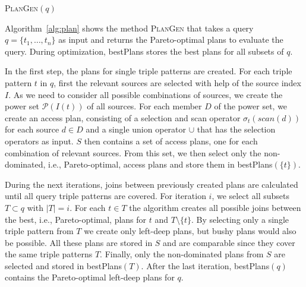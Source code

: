\begin{algorithm}
  \label{alg:plan}
  \DontPrintSemicolon


  \caption{\textsc{PlanGen}$(q)$}


  \Return {}
\end{algorithm}


Algorithm~\ref{alg:plan} shows the method \textsc{PlanGen} that takes
a query $q=\{t_1,\ldots,t_n\}$ as input and returns the Pareto-optimal
plans to evaluate the query. During optimization, \textsf{bestPlans}
stores the best plans for all subsets of $q$. 

In the first step, the plans for single triple patterns are
created. For each triple pattern $t$ in $q$, first the relevant
sources are selected with help of the source index $I$. As we need to
consider all possible combinations of sources, we create the power set
$\mathcal{P}(I(t))$ of all sources. For each member $D$ of the power
set, we create an access plan, consisting of a selection and scan
operator $\sigma_t(scan(d))$ for each source $d \in D$ and a single
union operator $\cup$ that has the selection operators as input. $S$
then contains a set of access plans, one for each combination of
relevant sources. From this set, we then select only the
non-dominated, i.e., Pareto-optimal, access plans and store them in
\textsf{bestPlans}$(\{t\})$.

During the next iterations, joins between previously created plans are
calculated until all query triple patterns are covered. For iteration
$i$, we select all subsets $T \subset q$ with $|T|=i$. For each $t \in
T$ the algorithm creates all possible joins between the best, i.e.,
Pareto-optimal, plans for $t$ and $T\setminus \{t\}$. By selecting
only a single triple pattern from $T$ we create only left-deep plans,
but bushy plans would also be possible.  All these plans are stored in
$S$ and are comparable since they cover the same triple patterns
$T$. Finally, only the non-dominated plans from $S$ are selected and
stored in \textsf{bestPlans}$(T)$. After the last iteration,
\textsf{bestPlans}$(q)$ contains the Pareto-optimal left-deep plans
for $q$.

